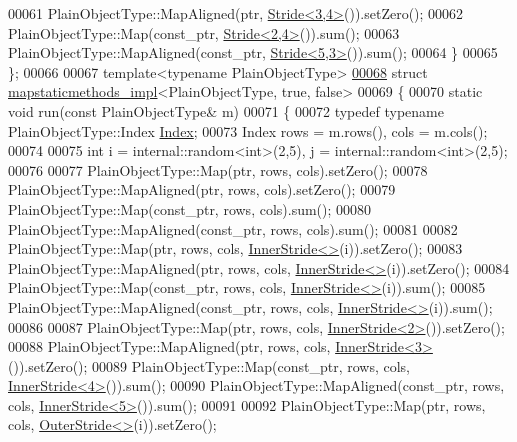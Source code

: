 \begin{DoxyCode}
00061     PlainObjectType::MapAligned(ptr, \hyperlink{group___core___module_class_eigen_1_1_stride}{Stride<3,4>}()).setZero();
00062     PlainObjectType::Map(const\_ptr, \hyperlink{group___core___module_class_eigen_1_1_stride}{Stride<2,4>}()).sum();
00063     PlainObjectType::MapAligned(const\_ptr, \hyperlink{group___core___module_class_eigen_1_1_stride}{Stride<5,3>}()).sum();
00064   \}
00065 \};
00066 
00067 \textcolor{keyword}{template}<\textcolor{keyword}{typename} PlainObjectType>
\hyperlink{structmapstaticmethods__impl_3_01_plain_object_type_00_01true_00_01false_01_4}{00068} \textcolor{keyword}{struct }\hyperlink{structmapstaticmethods__impl}{mapstaticmethods\_impl}<PlainObjectType, true, false>
00069 \{
00070   \textcolor{keyword}{static} \textcolor{keywordtype}{void} run(\textcolor{keyword}{const} PlainObjectType& m)
00071   \{
00072     \textcolor{keyword}{typedef} \textcolor{keyword}{typename} PlainObjectType::Index \hyperlink{namespace_eigen_a62e77e0933482dafde8fe197d9a2cfde}{Index};
00073     Index rows = m.rows(), cols = m.cols();
00074 
00075     \textcolor{keywordtype}{int} i = internal::random<int>(2,5), j = internal::random<int>(2,5);
00076 
00077     PlainObjectType::Map(ptr, rows, cols).setZero();
00078     PlainObjectType::MapAligned(ptr, rows, cols).setZero();
00079     PlainObjectType::Map(const\_ptr, rows, cols).sum();
00080     PlainObjectType::MapAligned(const\_ptr, rows, cols).sum();
00081 
00082     PlainObjectType::Map(ptr, rows, cols, \hyperlink{class_eigen_1_1_inner_stride}{InnerStride<>}(i)).setZero();
00083     PlainObjectType::MapAligned(ptr, rows, cols, \hyperlink{class_eigen_1_1_inner_stride}{InnerStride<>}(i)).setZero();
00084     PlainObjectType::Map(const\_ptr, rows, cols, \hyperlink{class_eigen_1_1_inner_stride}{InnerStride<>}(i)).sum();
00085     PlainObjectType::MapAligned(const\_ptr, rows, cols, \hyperlink{class_eigen_1_1_inner_stride}{InnerStride<>}(i)).sum();
00086 
00087     PlainObjectType::Map(ptr, rows, cols, \hyperlink{class_eigen_1_1_inner_stride}{InnerStride<2>}()).setZero();
00088     PlainObjectType::MapAligned(ptr, rows, cols, \hyperlink{class_eigen_1_1_inner_stride}{InnerStride<3>}()).setZero();
00089     PlainObjectType::Map(const\_ptr, rows, cols, \hyperlink{class_eigen_1_1_inner_stride}{InnerStride<4>}()).sum();
00090     PlainObjectType::MapAligned(const\_ptr, rows, cols, \hyperlink{class_eigen_1_1_inner_stride}{InnerStride<5>}()).sum();
00091 
00092     PlainObjectType::Map(ptr, rows, cols, \hyperlink{class_eigen_1_1_outer_stride}{OuterStride<>}(i)).setZero();

\end{DoxyCode}
